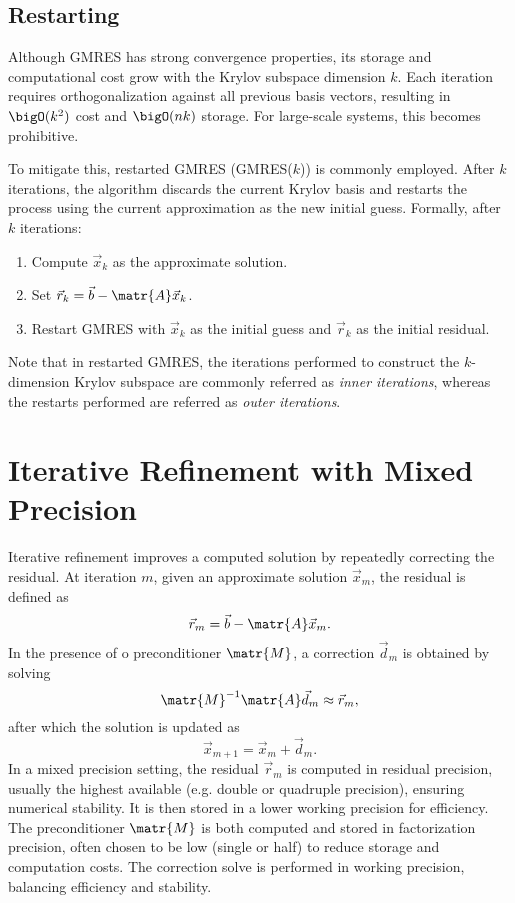 \subsection{Restarting}
\label{sec:restarting}

Although GMRES has strong convergence properties, its storage and computational
cost grow with the Krylov subspace dimension \(k\). Each iteration requires
orthogonalization against all previous basis vectors, resulting in \(\bigO(k^2)\)
cost and \(\bigO(nk)\) storage. For large-scale systems, this becomes prohibitive.

To mitigate this, restarted GMRES (GMRES(\(k\))) is commonly employed. After
\(k\) iterations, the algorithm discards the current Krylov basis and restarts
the process using the current approximation as the new initial guess. Formally,
after \(k\) iterations:
\begin{enumerate}
\item Compute \(\vec{x}_k\) as the approximate solution.
\item Set \(\vec{r}_k = \vec{b} - \matr{A} \vec{x}_k\).
\item Restart GMRES with \(\vec{x}_k\) as the initial guess and \(\vec{r}_k\) as the initial
  residual.
\end{enumerate}

Note that in restarted GMRES, the iterations performed to construct the
\(k\)-dimension Krylov subspace are commonly referred as \emph{inner iterations},
whereas the restarts performed are referred as \emph{outer iterations}.

\section{Iterative Refinement with Mixed Precision}
\label{sec:iter-refin-with}

Iterative refinement improves a computed solution by repeatedly correcting the
residual. At iteration \(m\), given an approximate solution \(\vec{x}_m\), the
residual is defined as
\begin{equation}
  \label{eq:ir-res}
  \vec{r}_m = \vec{b} - \matr{A} \vec{x}_m.
\end{equation}
In the presence of o preconditioner \(\matr{M}\), a correction \(\vec{d}_m\) is
obtained by solving \[\matr{M}^{-1}\matr{A} \vec{d}_m \approx \vec{r}_m,\] after
which the solution is updated as
\begin{equation}
  \label{eq:ir-update}
  \vec{x}_{m+1} = \vec{x}_m + \vec{d}_m.
\end{equation}
In a mixed precision setting, the residual \(\vec{r}_m\) is computed in residual
precision, usually the highest available (e.g. double or quadruple precision),
ensuring numerical stability. It is then stored in a lower working precision for
efficiency. The preconditioner \(\matr{M}\) is both computed and stored in
factorization precision, often chosen to be low (single or half) to reduce
storage and computation costs. The correction solve is performed in working
precision, balancing efficiency and stability.

